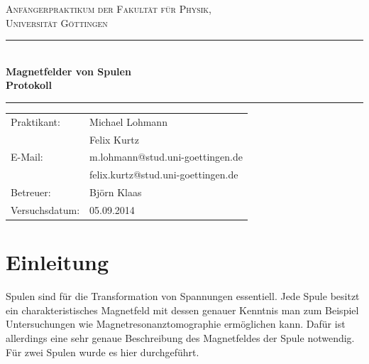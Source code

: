 \documentclass[12pt,a4paper,titlepage,headinclude,bibtotoc]{scrartcl}
\begin{document}
\begin{titlepage}
\centering
\textsc{\Large Anfängerpraktikum der Fakultät für
  Physik,\\[1.5ex] Universität Göttingen}

\vspace*{3.5cm}

\rule{\textwidth}{1pt}\\[0.5cm]
{\huge \bfseries
  Magnetfelder von Spulen\\[1.5ex]
  Protokoll}\\[0.5cm]
\rule{\textwidth}{1pt}

\vspace*{3.5cm}

\begin{Large}
\begin{tabular}{ll}
Praktikant: &  Michael Lohmann\\
 &  Felix Kurtz\\
 E-Mail: & m.lohmann@stud.uni-goettingen.de\\
 &  felix.kurtz@stud.uni-goettingen.de\\
 Betreuer: & Björn Klaas\\
 Versuchsdatum: & 05.09.2014\\
\end{tabular}
\end{Large}

\vspace*{0.8cm}

\begin{Large}
\end{Large}

\end{titlepage}

\tableofcontents

\newpage

\section{Einleitung}
\label{sec:einleitung}
Spulen sind für die Transformation von Spannungen essentiell.
Jede Spule besitzt ein charakteristisches Magnetfeld mit dessen genauer Kenntnis man zum Beispiel Untersuchungen wie Magnetresonanztomographie ermöglichen kann.
Dafür ist allerdings eine sehr genaue Beschreibung des Magnetfeldes der Spule notwendig.
Für zwei Spulen wurde es hier durchgeführt.
\cite{gerthsen}
\end{document}
